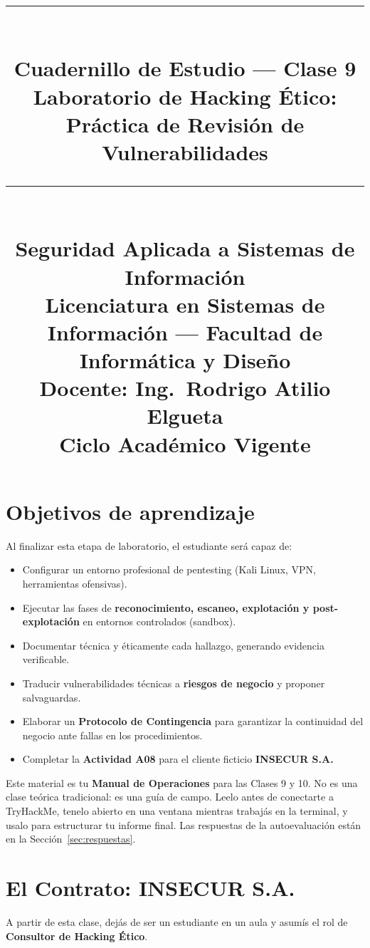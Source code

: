 \documentclass[11pt,a4paper]{article}
\title{%
  \rule{\textwidth}{1pt}\\[0.4cm]
  \textbf{\Large Cuadernillo de Estudio --- Clase 9}\\[0.2cm]
  \large Laboratorio de Hacking Ético: Práctica de Revisión de Vulnerabilidades\\[0.2cm]
  \rule{\textwidth}{1pt}\\[0.4cm]
  \normalsize Seguridad Aplicada a Sistemas de Información\\
  Licenciatura en Sistemas de Información --- Facultad de Informática y Diseño\\
  Docente: Ing.\ Rodrigo Atilio Elgueta\\[0.2cm]
  \small Ciclo Académico Vigente
}
\author{}
\date{}
\begin{document}
\maketitle
\thispagestyle{fancy}
\tableofcontents
\newpage

\section{Objetivos de aprendizaje}
Al finalizar esta etapa de laboratorio, el estudiante será capaz de:

\begin{itemize}[leftmargin=*]
  \item Configurar un entorno profesional de pentesting (Kali Linux, VPN, herramientas ofensivas).
  \item Ejecutar las fases de \textbf{reconocimiento, escaneo, explotación y post-explotación} en entornos controlados (sandbox).
  \item Documentar técnica y éticamente cada hallazgo, generando evidencia verificable.
  \item Traducir vulnerabilidades técnicas a \textbf{riesgos de negocio} y proponer salvaguardas.
  \item Elaborar un \textbf{Protocolo de Contingencia} para garantizar la continuidad del negocio ante fallas en los procedimientos.
  \item Completar la \textbf{Actividad A08} para el cliente ficticio \textbf{INSECUR S.A.}
\end{itemize}

\begin{clave}
Este material es tu \textbf{Manual de Operaciones} para las Clases 9 y 10. No es una clase teórica tradicional: es una guía de campo. Leelo antes de conectarte a TryHackMe, tenelo abierto en una ventana mientras trabajás en la terminal, y usalo para estructurar tu informe final. Las respuestas de la autoevaluación están en la Sección~\ref{sec:respuestas}.
\end{clave}

\section{El Contrato: INSECUR S.A.}
A partir de esta clase, dejás de ser un estudiante en un aula y asumís el rol de \textbf{Consultor de Hacking Ético}.
\end{document}
